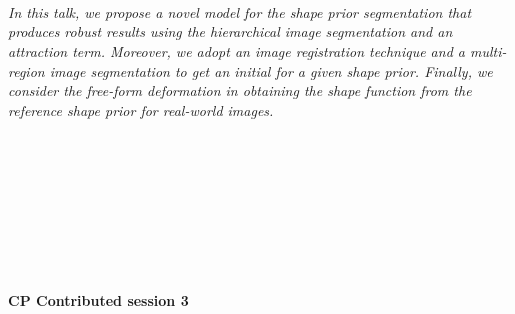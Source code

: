 \begin{multicols}{2}
\\ 
        \\
        \\\\
        \\
        \\\\
\\
      \textit{In this talk, we propose a novel model for the shape prior segmentation that produces robust results using the hierarchical image segmentation and an attraction term. Moreover, we adopt an image registration technique and a multi-region image segmentation to get an initial for a given shape prior. Finally, we consider the free-form deformation in obtaining the shape function from the reference shape prior for real-world images.}\\
\\ 
        \\
        \\\\
        \\
        \\\\
\\
\end{multicols}
  \noindent\textbf{CP Contributed session 3}\\
  \textit{} \\
    
